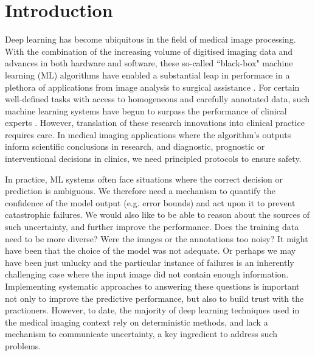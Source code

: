 \chapter{Introduction}
\label{chapter:intro}

Deep learning \cite{lecun2015deep} has become ubiquitous in the field of medical image processing. With the combination of the increasing volume of digitised imaging data and advances in both hardware and software,  these so-called ``black-box" machine learning (ML) algorithms have enabled a substantial leap in performace in a plethora of applications from image analysis to surgical assistance \cite{litjens2017survey,shen2017deep}. For certain well-defined tasks with access to homogeneous and carefully annotated data, such machine learning systems have begun to surpass the performance of clinical experts \cite{esteva2017dermatologist,gulshan2016development,rajpurkar2017chexnet,wu2019deep}. However, translation of these research innovations into clinical practice requires care. In medical imaging applications where the algorithm's outputs inform scientific conclusions in research, and diagnostic, prognostic or interventional decisions in clinics, we need principled protocols to ensure safety. 

In practice, ML systems often face situations where the correct decision or prediction is ambiguous. We therefore need a mechanism to quantify the confidence of the model output (e.g. error bounds) and act upon it to prevent catastrophic failures. We would also like to be able to reason about the sources of such uncertainty, and further improve the performance. Does the training data need to be more diverse? Were the images or the annotations too noisy? It might have been that the choice of the model was not adequate. Or perhaps we may have been just unlucky and the particular instance of failures is an inherently challenging case where the input image did not contain enough information. Implementing systematic approaches to answering these questions is important not only to improve the predictive performance, but also to build trust with the practioners. However, to date, the majority of deep learning techniques used in the medical imaging context rely on deterministic methods, and lack a mechanism to communicate uncertainty, a key ingredient to address such problems. 

